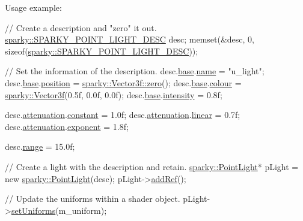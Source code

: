 Usage example\+: 
\begin{DoxyCode}
\textcolor{comment}{// Create a description and "zero" it out.}
\hyperlink{structsparky_1_1_s_p_a_r_k_y___p_o_i_n_t___l_i_g_h_t___d_e_s_c}{sparky::SPARKY\_POINT\_LIGHT\_DESC} desc;
memset(&desc, 0, \textcolor{keyword}{sizeof}(\hyperlink{structsparky_1_1_s_p_a_r_k_y___p_o_i_n_t___l_i_g_h_t___d_e_s_c}{sparky::SPARKY\_POINT\_LIGHT\_DESC}));

\textcolor{comment}{// Set the information of the description.}
desc.\hyperlink{structsparky_1_1_s_p_a_r_k_y___p_o_i_n_t___l_i_g_h_t___d_e_s_c_ab07cf32717f09f5a977e5f760961fb4a}{base}.\hyperlink{structsparky_1_1_s_p_a_r_k_y___b_a_s_e___l_i_g_h_t___d_e_s_c_a0b3e29108f714a6004fca8e4a1d6cf67}{name} = \textcolor{stringliteral}{"u\_light"};
desc.\hyperlink{structsparky_1_1_s_p_a_r_k_y___p_o_i_n_t___l_i_g_h_t___d_e_s_c_ab07cf32717f09f5a977e5f760961fb4a}{base}.\hyperlink{structsparky_1_1_s_p_a_r_k_y___b_a_s_e___l_i_g_h_t___d_e_s_c_aed72b3ed8f00100cee86d32063909a48}{position} = \hyperlink{classsparky_1_1_vector3_accf83dce35ce0cd7aeeb865fe3e9e7a9}{sparky::Vector3f::zero}();
desc.\hyperlink{structsparky_1_1_s_p_a_r_k_y___p_o_i_n_t___l_i_g_h_t___d_e_s_c_ab07cf32717f09f5a977e5f760961fb4a}{base}.\hyperlink{structsparky_1_1_s_p_a_r_k_y___b_a_s_e___l_i_g_h_t___d_e_s_c_a87e733aa6c7f8cecf430e5d09f424035}{colour} = \hyperlink{classsparky_1_1_vector3}{sparky::Vector3f}(0.5f, 0.0f, 0.0f);
desc.\hyperlink{structsparky_1_1_s_p_a_r_k_y___p_o_i_n_t___l_i_g_h_t___d_e_s_c_ab07cf32717f09f5a977e5f760961fb4a}{base}.\hyperlink{structsparky_1_1_s_p_a_r_k_y___b_a_s_e___l_i_g_h_t___d_e_s_c_a3e2f83fe7f13727f235e957debb54634}{intensity} = 0.8f;

desc.\hyperlink{structsparky_1_1_s_p_a_r_k_y___p_o_i_n_t___l_i_g_h_t___d_e_s_c_a61495a6dedb077e939aea5be9cd72619}{attenuation}.\hyperlink{structsparky_1_1_attenuation_a0bbefcc87e251c6bdbd34f889e2906ce}{constant} = 1.0f;
desc.\hyperlink{structsparky_1_1_s_p_a_r_k_y___p_o_i_n_t___l_i_g_h_t___d_e_s_c_a61495a6dedb077e939aea5be9cd72619}{attenuation}.\hyperlink{structsparky_1_1_attenuation_a2cd5cc43f8b4495b399037a94c30ffea}{linear} = 0.7f;
desc.\hyperlink{structsparky_1_1_s_p_a_r_k_y___p_o_i_n_t___l_i_g_h_t___d_e_s_c_a61495a6dedb077e939aea5be9cd72619}{attenuation}.\hyperlink{structsparky_1_1_attenuation_ad2b6be370c7b71c9755903db2506a49f}{exponent} = 1.8f;

desc.\hyperlink{structsparky_1_1_s_p_a_r_k_y___p_o_i_n_t___l_i_g_h_t___d_e_s_c_a1aa05df10bea864c48c19df36c877281}{range} = 15.0f;

\textcolor{comment}{// Create a light with the description and retain.}
\hyperlink{classsparky_1_1_point_light}{sparky::PointLight}* pLight = \textcolor{keyword}{new} \hyperlink{classsparky_1_1_point_light}{sparky::PointLight}(desc);
pLight->\hyperlink{classsparky_1_1_ref_aeeb606836c315aa3b8a2254e23eb0899}{addRef}();

\textcolor{comment}{// Update the uniforms within a shader object.}
pLight->\hyperlink{classsparky_1_1_point_light_a09d074c94750d1bf892eaf2e757d1aec}{setUniforms}(m\_uniform);
\end{DoxyCode}
 

